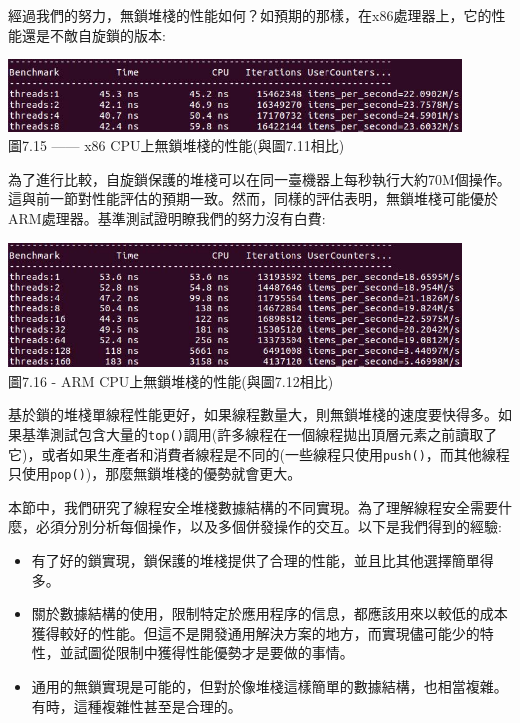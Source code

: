 經過我們的努力，無鎖堆棧的性能如何？如預期的那樣，在x86處理器上，它的性能還是不敵自旋鎖的版本:

\begin{center}
\includegraphics[width=0.9\textwidth]{content/2/chapter7/images/15.jpg}\\ 
圖7.15 —— x86 CPU上無鎖堆棧的性能(與圖7.11相比)
\end{center}

為了進行比較，自旋鎖保護的堆棧可以在同一臺機器上每秒執行大約70M個操作。這與前一節對性能評估的預期一致。然而，同樣的評估表明，無鎖堆棧可能優於ARM處理器。基準測試證明瞭我們的努力沒有白費:

\begin{center}
\includegraphics[width=0.9\textwidth]{content/2/chapter7/images/16.jpg}\\ 
圖7.16 - ARM CPU上無鎖堆棧的性能(與圖7.12相比)
\end{center}

基於鎖的堆棧單線程性能更好，如果線程數量大，則無鎖堆棧的速度要快得多。如果基準測試包含大量的\texttt{top()}調用(許多線程在一個線程拋出頂層元素之前讀取了它)，或者如果生產者和消費者線程是不同的(一些線程只使用\texttt{push()}，而其他線程只使用\texttt{pop()})，那麼無鎖堆棧的優勢就會更大。

本節中，我們研究了線程安全堆棧數據結構的不同實現。為了理解線程安全需要什麼，必須分別分析每個操作，以及多個併發操作的交互。以下是我們得到的經驗:

\begin{itemize}
\item 
有了好的鎖實現，鎖保護的堆棧提供了合理的性能，並且比其他選擇簡單得多。

\item 
關於數據結構的使用，限制特定於應用程序的信息，都應該用來以較低的成本獲得較好的性能。但這不是開發通用解決方案的地方，而實現儘可能少的特性，並試圖從限制中獲得性能優勢才是要做的事情。

\item 
通用的無鎖實現是可能的，但對於像堆棧這樣簡單的數據結構，也相當複雜。有時，這種複雜性甚至是合理的。

\end{itemize}

